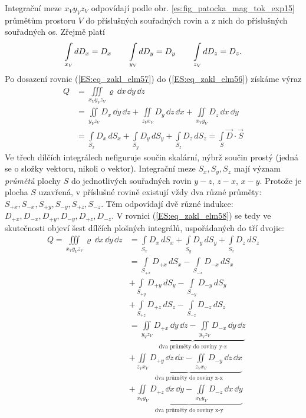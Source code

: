       Integrační meze \(x_Vy_Vz_V\) odpovídají podle obr. \ref{es:fig_patocka_mag_tok_exp15} 
      průmětům prostoru \(V\) do příslušných souřadných rovin a z nich do příslušných souřadných 
      os. Zřejmě platí
      \begin{equation}\label{ES:eq_zakl_elm57}
        \limitint_{\mathclap{x_V}}dD_x = D_x \qquad
        \limitint_{\mathclap{y_V}}dD_y = D_y \qquad
        \limitint_{\mathclap{z_V}}dD_z = D_z.
      \end{equation}
      Po dosazení rovnic (\ref{ES:eq_zakl_elm57}) do (\ref{ES:eq_zakl_elm56}) získáme výraz
      \begin{align}\label{ES:eq_zakl_elm58}
        Q &= \iiint\limits_{x_Vy_Vz_V}\varrho\,\dd{x}\,\dd{y}\,\dd{z}   \nonumber\\ 
          &= \iint\limits_{y_Vz_V}D_x\,\dd{y}\,\dd{z} + 
             \iint\limits_{z_Vx_V}D_y\,\dd{z}\,\dd{x} + 
             \iint\limits_{x_Vy_V}D_z\,\dd{x}\,\dd{y}               \nonumber\\ 
          &= \int\limits_{S_x}D_x\,dS_x + 
             \int\limits_{S_y}D_y\,dS_y + 
             \int\limits_{S_z}D_z\,dS_z =  \int\limits_{S}\vec{D}\cdot\vec{S}
      \end{align}
      Ve třech dílčích integrálech nefiguruje součin skalární, nýbrž součin prostý (jedná se o 
      složky vektoru, nikoli o vektor). Integrační meze \(S_x, S_y, S_z\) mají význam 
      \emph{průmětů} plochy \(S\) do jednotlivých souřadných rovin \(y-z\), \(z-x\), \(x-y\). 
      Protože je plocha \(S\) uzavřená, v příslušné rovině existují vždy dva různé průměty: 
      \(S_{+x}, S_{-x}, S_{+y}, S_{-y}, S_{+z}, S_{-z}\). Těm odpovídají dvě různé indukce: 
      \(D_{+x}, D_{-x}, D_{+y}, D_{-y}, D_{+z}, D_{-z}\). V rovnici (\ref{ES:eq_zakl_elm58}) se 
      tedy ve skutečnosti objeví šest dílčích plošných integrálů, uspořádaných do tří dvojic:
      \begin{align*}   %
        Q  = \iiint\limits_{x_Vy_Vz_V}\varrho\,\dd{x}\,\dd{y}\,\dd{z}   
          &= \int\limits_{S_x}D_x\,dS_x + 
             \int\limits_{S_y}D_y\,dS_y + 
             \int\limits_{S_z}D_z\,dS_z                                                \\
          &= \int\limits_{S_{+x}}D_{+x}\,dS_x - \int\limits_{S_{-x}}D_{-x}\,dS_x       \\
          &+ \int\limits_{S_{+y}}D_{+y}\,dS_y - \int\limits_{S_{-y}}D_{-y}\,dS_y       \\
          &+ \int\limits_{S_{+z}}D_{+z}\,dS_z - \int\limits_{S_{-z}}D_{-z}\,dS_z       \\
          &= \underbrace{\iint\limits_{y_Vz_V}D_{+x}\,\dd{y}\,\dd{z} 
           - \iint\limits_{y_Vz_V}D_{-x}\,\dd{y}\,\dd{z}}_{\text{dva průměty do roviny y-z}}   \\
          &+ \underbrace{\iint\limits_{z_Vx_V}D_{+y}\,\dd{z}\,\dd{x} 
           - \iint\limits_{z_Vx_V}D_{-y}\,\dd{z}\,\dd{x}}_{\text{dva průměty do roviny z-x}}   \\
          &+ \underbrace{\iint\limits_{x_Vy_V}D_{+z}\,\dd{x}\,\dd{y} 
           - \iint\limits_{x_Vy_V}D_{-z}\,\dd{x}\,\dd{y}}_{\text{dva průměty do roviny x-y}}
      \end{align*}
